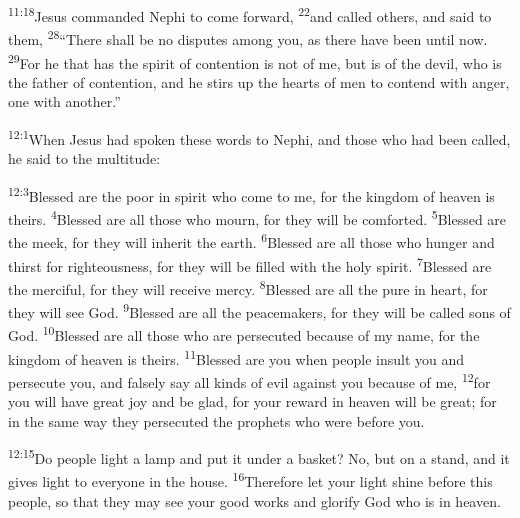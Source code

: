 \documentclass[openany,12pt,english]{book}
\newenvironment{para}{\par\pretolerance=100\tolerance=200\setlength{\emergencystretch}{0.6em}\relax}{\par}
\begin{document}
\begin{para}
    \textsuperscript{11:18}\thinspace{}Jesus commanded Nephi to come for\-ward,
    \textsuperscript{22}\thinspace{}and called others, and said to them,
    \textsuperscript{28}\thinspace{}“There shall be no disputes a\-mong you, as there have been un\-til now.
    \textsuperscript{29}\thinspace{}For he that has the spir\-it of con\-ten\-tion is not of me, but is of the dev\-il, who is the fa\-ther of con\-ten\-tion, and he stirs up the hearts of men to con\-tend with an\-ger, one with an\-oth\-er.”
\end{para}

\bigskip{}

\begin{para}
    \textsuperscript{12:1}\thinspace{}When Jesus had spo\-ken these words to Nephi, and those who had been called, he said to the mul\-ti\-tude:
\end{para}

\begin{para}
    \textsuperscript{12:3}\thinspace{}Bless\-ed are the poor in spir\-it who come to me, for the king\-dom of heav\-en is theirs.
    \textsuperscript{4}\thinspace{}Bless\-ed are all those who mourn, for they will be comforted.
    \textsuperscript{5}\thinspace{}Bless\-ed are the meek, for they will in\-her\-it the earth.
    \textsuperscript{6}\thinspace{}Bless\-ed are all those who hun\-ger and thirst for right\-eous\-ness, for they will be filled with the ho\-ly spir\-it.
    \textsuperscript{7}\thinspace{}Bless\-ed are the mer\-ci\-ful, for they will re\-ceive mer\-cy.
    \textsuperscript{8}\thinspace{}Bless\-ed are all the pure in heart, for they will see God.
    \textsuperscript{9}\thinspace{}Bless\-ed are all the peacemakers, for they will be called sons of God.
    \textsuperscript{10}\thinspace{}Bless\-ed are all those who are per\-se\-cut\-ed be\-cause of my name, for the king\-dom of heav\-en is theirs.
    \textsuperscript{11}\thinspace{}Bless\-ed are you when peo\-ple in\-sult you and per\-se\-cute you, and false\-ly say all kinds of evil against you be\-cause of me,
    \textsuperscript{12}\thinspace{}for you will have great joy and be glad, for your re\-ward in heav\-en will be great; for in the same way they per\-se\-cut\-ed the prophets who were be\-fore you.
\end{para}

\begin{para}
    \textsuperscript{12:15}\thinspace{}Do peo\-ple light a lamp and put it un\-der a bas\-ket? No, but on a stand, and it gives light to eve\-ry\-one in the house.
    \textsuperscript{16}\thinspace{}There\-fore let your light shine be\-fore this peo\-ple, so that they may see your good works and glo\-ri\-fy God who is in heav\-en.
\end{para}
\end{document}
